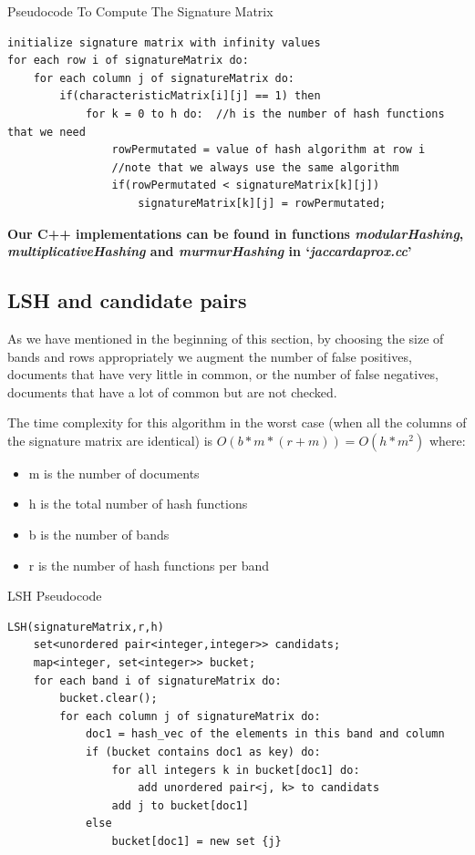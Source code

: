 \documentclass[12pt]{article}
\begin{document}
{ \begin{center}
\begin{large}
Pseudocode To Compute The Signature Matrix
\end{large}
\end{center}
\begin{lstlisting}
initialize signature matrix with infinity values
for each row i of signatureMatrix do:
	for each column j of signatureMatrix do:
		if(characteristicMatrix[i][j] == 1) then
			for k = 0 to h do:	//h is the number of hash functions that we need
				rowPermutated = value of hash algorithm at row i
				//note that we always use the same algorithm
				if(rowPermutated < signatureMatrix[k][j])
					signatureMatrix[k][j] = rowPermutated;
\end{lstlisting}

\bigskip
\textbf{Our C++ implementations can be found in functions \textit{\mbox{modularHashing}}, \textit{\mbox{multiplicativeHashing}} and \textit{\mbox{murmurHashing}} in `\textit{\mbox{jaccardaprox.cc}}'}

\subsection{LSH and candidate pairs}
As we have mentioned in the beginning of this section, by choosing the size of bands and rows appropriately we augment the number of false positives, documents that have very little in common, or the number of false negatives, documents that have a lot of common but are not checked. 

\bigskip
The time complexity for this algorithm in the worst case (when all the columns of the signature matrix are identical) is $O(b*m*(r+m)) = O(h*m^2)$ where: 
\begin{itemize}
\item m is the number of documents
\item h is the total number of hash functions
\item b is the number of bands
\item r is the number of hash functions per band
\end{itemize}
 \begin{center}
\begin{large}
LSH Pseudocode
\end{large}
\end{center}

\begin{lstlisting}
LSH(signatureMatrix,r,h)
    set<unordered pair<integer,integer>> candidats;                     
    map<integer, set<integer>> bucket;
    for each band i of signatureMatrix do:
        bucket.clear();
        for each column j of signatureMatrix do:
            doc1 = hash_vec of the elements in this band and column
            if (bucket contains doc1 as key) do:
            	for all integers k in bucket[doc1] do:
            		add unordered pair<j, k> to candidats
            	add j to bucket[doc1]
            else
            	bucket[doc1] = new set {j}
            	

\end{lstlisting}}
\end{document}
